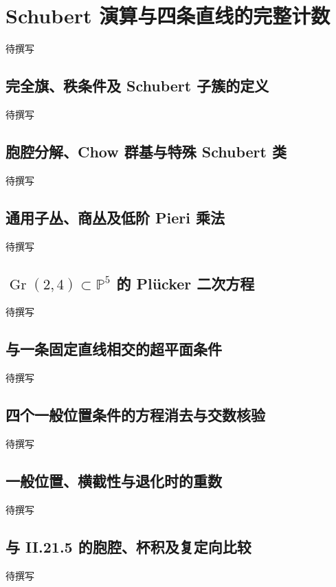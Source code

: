 
% 
% 
% 
% 
% 
% 
% 

\section{Schubert 演算与四条直线的完整计数}
\label{g5:sec:2705}

待撰写

\subsection{完全旗、秩条件及 Schubert 子簇的定义}
\label{g5:subsec:2705:01}
待撰写

\subsection{胞腔分解、Chow 群基与特殊 Schubert 类}
\label{g5:subsec:2705:02}
待撰写

\subsection{通用子丛、商丛及低阶 Pieri 乘法}
\label{g5:subsec:2705:03}
待撰写

\subsection{\texorpdfstring{\(\operatorname{Gr}(2,4)\subset\mathbb P^5\) 的 Plücker 二次方程}{Gr(2,4)⊂P⁵ 的 Plücker 二次方程}}
\label{g5:subsec:2705:04}
待撰写

\subsection{与一条固定直线相交的超平面条件}
\label{g5:subsec:2705:05}
待撰写

\subsection{四个一般位置条件的方程消去与交数核验}
\label{g5:subsec:2705:06}
待撰写

\subsection{一般位置、横截性与退化时的重数}
\label{g5:subsec:2705:07}
待撰写

\subsection{与 II.21.5 的胞腔、杯积及复定向比较}
\label{g5:subsec:2705:08}
待撰写
